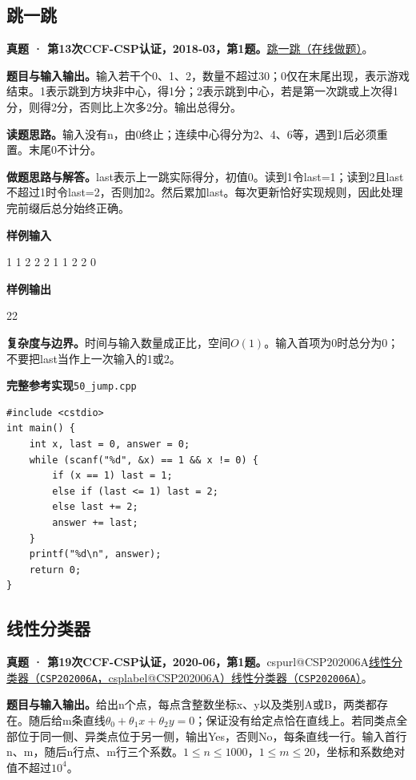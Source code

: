 \documentclass[UTF8,11pt,a4paper,fontset=none]{ctexart}
\makeatletter
\newcommand{\csp}[2]{\ifcsname cspurl@#1\endcsname\href{\csname cspurl@#1\endcsname}{#2（\texttt{#1}，\csname csplabel@#1\endcsname）}\else\href{https://oj.shumeng.tech/p/#1}{#2（\texttt{#1}）}\fi}
\makeatother
\begin{document}
\subsection{跳一跳}
\textbf{真题 · 第13次CCF-CSP认证，2018-03，第1题。}\href{https://www.acwing.com/problem/content/3260/}{跳一跳（在线做题）}。

\noindent\textbf{题目与输入输出。}输入若干个0、1、2，数量不超过30；0仅在末尾出现，表示游戏结束。1表示跳到方块非中心，得1分；2表示跳到中心，若是第一次跳或上次得1分，则得2分，否则比上次多2分。输出总得分。

\noindent\textbf{读题思路。}输入没有n，由0终止；连续中心得分为2、4、6等，遇到1后必须重置。末尾0不计分。

\noindent\textbf{做题思路与解答。}last表示上一跳实际得分，初值0。读到1令last=1；读到2且last不超过1时令last=2，否则加2。然后累加last。每次更新恰好实现规则，因此处理完前缀后总分始终正确。
\begin{tcolorbox}[samplebox,title={输入输出样例}]
\textbf{样例输入}
\begin{Sample}
1 1 2 2 2 1 1 2 2 0
\end{Sample}
\tcblower
\textbf{样例输出}
\begin{Sample}
22
\end{Sample}
\end{tcolorbox}

\noindent\textbf{复杂度与边界。}时间与输入数量成正比，空间$O(1)$。输入首项为0时总分为0；不要把last当作上一次输入的1或2。
\par\noindent\begin{minipage}{\linewidth}
\textbf{完整参考实现}\quad\texttt{50\_jump.cpp}
\begin{lstlisting}
#include <cstdio>
int main() {
    int x, last = 0, answer = 0;
    while (scanf("%d", &x) == 1 && x != 0) {
        if (x == 1) last = 1;
        else if (last <= 1) last = 2;
        else last += 2;
        answer += last;
    }
    printf("%d\n", answer);
    return 0;
}
\end{lstlisting}
\end{minipage}\par

\subsection{线性分类器}
\textbf{真题 · 第19次CCF-CSP认证，2020-06，第1题。}\csp{CSP202006A}{线性分类器}。

\noindent\textbf{题目与输入输出。}给出n个点，每点含整数坐标x、y以及类别A或B，两类都存在。随后给m条直线$\theta_0+\theta_1x+\theta_2y=0$；保证没有给定点恰在直线上。若同类点全部位于同一侧、异类点位于另一侧，输出Yes，否则No，每条直线一行。输入首行n、m，随后n行点、m行三个系数。$1\le n\le1000$，$1\le m\le20$，坐标和系数绝对值不超过$10^4$。
\end{document}

